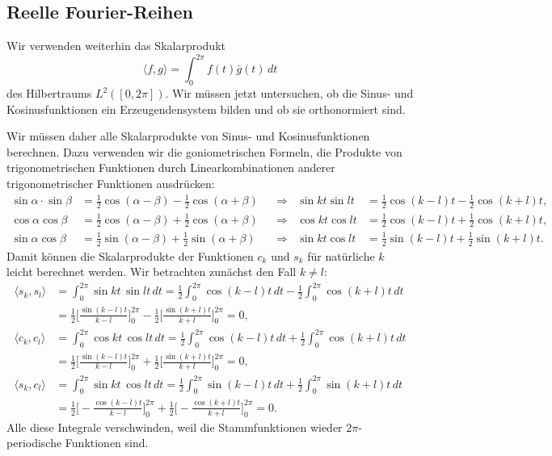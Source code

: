 \subsection{Reelle Fourier-Reihen}
\label{subsection:real-fourier-series}
Wir verwenden weiterhin das Skalarprodukt
\[
\langle f,g\rangle
=
\int_0^{2\pi} f(t) \bar{g}(t)\,dt
\]
des Hilbertraums $L^2([0,2\pi])$.
Wir müssen jetzt untersuchen, ob die Sinus- und Kosinusfunktionen
ein Erzeugendensystem bilden und ob sie orthonormiert sind.

Wir müssen daher alle Skalarprodukte von Sinus- und Kosinusfunktionen
berechnen.
%
Dazu verwenden wir die goniometrischen Formeln, die Produkte von
trigonometrischen Funktionen durch Linearkombinationen anderer
trigonometrischer Funktionen ausdrücken:
\begin{align*}
\sin\alpha\cdot \sin\beta
&=
\frac12 \cos(\alpha-\beta) - \frac12\cos(\alpha+\beta)
&&\Rightarrow&
\sin kt \sin lt
&=
\frac12 \cos(k-l)t - \frac12\cos(k+l)t,
\\
\cos\alpha \cos\beta
&=
\frac12\cos(\alpha-\beta) +\frac12\cos(\alpha+\beta)
&&\Rightarrow&
\cos kt \cos lt
&=
\frac12\cos(k-l)t + \frac12\cos(k+l)t,
\\
\sin\alpha\cos\beta
&=
\frac12\sin(\alpha-\beta) + \frac12\sin(\alpha+\beta)
&&\Rightarrow&
\sin kt\cos lt
&=
\frac12\sin(k-l)t + \frac12\sin(k+l)t.
\end{align*}
Damit können die Skalarprodukte der Funktionen $c_k$ und $s_k$ für natürliche
$k$ leicht berechnet werden.
Wir betrachten zunächst den Fall $k\ne l$:
\begin{align*}
\langle s_k, s_l\rangle
&=
\int_0^{2\pi} \sin kt\, \sin lt \,dt
=
\frac12\int_0^{2\pi} \cos(k-l)t\,dt
-
\frac12\int_0^{2\pi} \cos(k+l)t\,dt
\\
&=
\frac12\biggl[ \frac{\sin(k-l)t}{k-l} \biggr]_0^{2\pi}
-
\frac12\biggl[ \frac{\sin(k+l)t}{k+l} \biggr]_0^{2\pi}
=
0,
\\
\langle c_k, c_l\rangle
&=
\int_0^{2\pi} \cos kt\, \cos lt \,dt
=
\frac12\int_0^{2\pi}\cos(k-l)t\,dt
+
\frac12\int_0^{2\pi}\cos(k+l)t\,dt
\\
&=
\frac12\biggl[ \frac{\sin (k-l)t}{k-l}\biggr]_0^{2\pi}
+
\frac12\biggl[ \frac{\sin (k+l)t}{k+l}\biggr]_0^{2\pi}
=
0,
\\
\langle s_k, c_l\rangle
&=
\int_0^{2\pi} \sin kt\, \cos lt \,dt
=
\frac12\int_0^{2\pi} \sin(k-l)t\,dt
+
\frac12\int_0^{2\pi} \sin(k+l)t\,dt
\\
&=
\frac12\biggl[-\frac{\cos(k-l)t}{k-l}\biggr]_0^{2\pi}
+
\frac12\biggl[-\frac{\cos(k+l)t}{k+l}\biggr]_0^{2\pi}
=
0.
\end{align*}
Alle diese Integrale verschwinden, weil die Stammfunktionen wieder
$2\pi$-periodische Funktionen sind.

